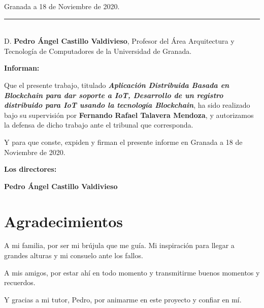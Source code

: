 \begin{flushright}
Granada a 18 de Noviembre de 2020.
\end{flushright}
\clearpage


\newpage
\thispagestyle{empty}

\noindent\rule[-1ex]{\textwidth}{2pt}\\[4.5ex]

D. \textbf{Pedro Ángel Castillo Valdivieso}, Profesor del Área Arquitectura y Tecnología de Computadores de la Universidad de Granada.

\vspace{0.5cm}

\textbf{Informan:}

\vspace{0.5cm}

Que el presente trabajo, titulado \textit{\textbf{Aplicación Distribuida Basada en Blockchain para dar soporte a IoT, Desarrollo de un registro distribuido 
para IoT usando la tecnología Blockchain}}, ha sido realizado bajo su supervisión por \textbf{Fernando Rafael Talavera Mendoza}, y autorizamos la 
defensa de dicho trabajo ante el tribunal que corresponda.

\vspace{0.5cm}

Y para que conste, expiden y firman el presente informe en Granada a 18 de Noviembre de 2020.

\vspace{1cm}

\textbf{Los directores:}

\vspace{5cm}

\noindent \textbf{Pedro Ángel Castillo Valdivieso}

\newpage
\thispagestyle{empty}

\section*{Agradecimientos}
\thispagestyle{empty}
\vspace{1cm}

A mi familia, por ser mi brújula que me guía. Mi inspiración para llegar a grandes alturas y mi consuelo ante los fallos.

\vspace{5mm}

A mis amigos, por estar ahí en todo momento y transmitirme buenos momentos y recuerdos.

\vspace{5mm}

Y gracias a mi tutor, Pedro, por animarme en este proyecto y confiar en mí.

\myemptypage
